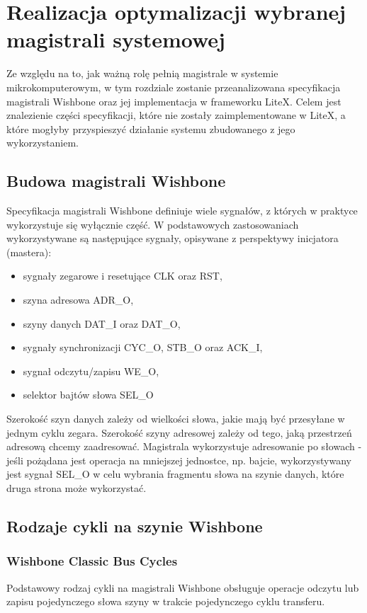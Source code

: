 \section{Realizacja optymalizacji wybranej magistrali systemowej}
Ze względu na to, jak ważną rolę pełnią magistrale w systemie mikrokomputerowym, w tym rozdziale zostanie przeanalizowana specyfikacja magistrali Wishbone oraz jej implementacja w frameworku LiteX. Celem jest znalezienie części specyfikacji, które nie zostały zaimplementowane w LiteX, a które mogłyby przyspieszyć działanie systemu zbudowanego z jego wykorzystaniem.

\subsection{Budowa magistrali Wishbone}
Specyfikacja magistrali Wishbone definiuje wiele sygnałów, z których w praktyce wykorzystuje się wyłącznie część. W podstawowych zastosowaniach wykorzystywane są następujące sygnały, opisywane z perspektywy inicjatora (mastera):
\begin{itemize}
    \item sygnały zegarowe i resetujące CLK oraz RST,
    \item szyna adresowa ADR_O,
    \item szyny danych DAT_I oraz DAT_O,
    \item sygnały synchronizacji CYC_O, STB_O oraz ACK_I,
    \item sygnał odczytu/zapisu WE_O,
    \item selektor bajtów słowa SEL_O
\end{itemize}

Szerokość szyn danych zależy od wielkości słowa, jakie mają być przesyłane w jednym cyklu zegara. Szerokość szyny adresowej zależy od tego, jaką przestrzeń adresową chcemy zaadresować. Magistrala wykorzystuje adresowanie po słowach - jeśli pożądana jest operacja na mniejszej jednostce, np. bajcie, wykorzystywany jest sygnał SEL_O w celu wybrania fragmentu słowa na szynie danych, które druga strona może wykorzystać.

\subsection{Rodzaje cykli na szynie Wishbone}

\subsubsection{Wishbone Classic Bus Cycles}
Podstawowy rodzaj cykli na magistrali Wishbone obsługuje operacje odczytu lub zapisu pojedynczego słowa szyny w trakcie pojedynczego cyklu transferu.

